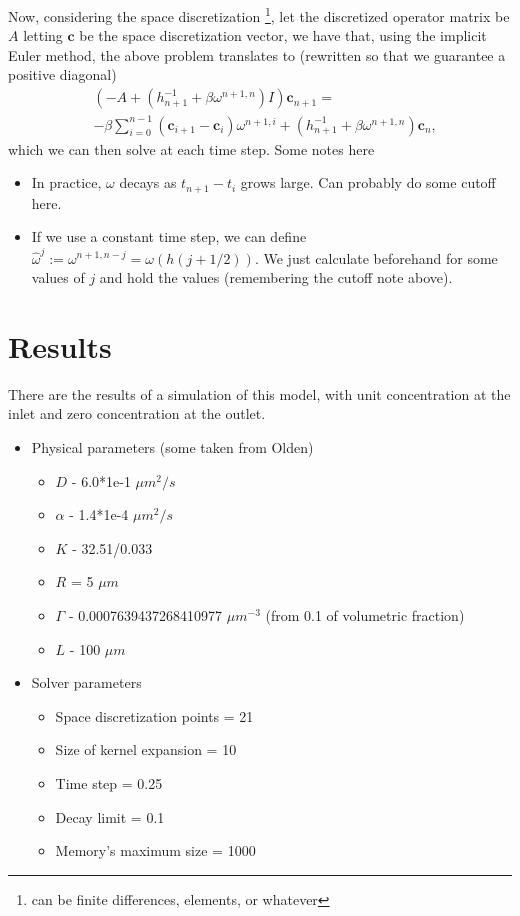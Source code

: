 \documentclass[]{article}
\begin{document}
Now, considering the space discretization \footnote{can be finite differences, elements, or whatever}, let the discretized operator matrix be $A$ letting $\mathbf{c}$ be the space discretization vector, we have that, using the implicit Euler method, the above problem translates to (rewritten so that we guarantee a positive diagonal)
\begin{equation}
 \begin{split}
 & \left(-A + (h_{n+1}^{-1} + \beta \omega^{n+1, n}) I \right)\mathbf{c}_{n+1} = \\
 & -\beta \sum_{i=0}^{n-1} (\mathbf{c}_{i+1} - \mathbf{c}_i) \omega^{n+1, i} + \left(h_{n+1}^{-1} + \beta \omega^{n+1, n} \right) \mathbf{c}_{n},
 \end{split}
\end{equation}
which we can then solve at each time step. Some notes here
\begin{itemize}
	\item In practice, $\omega$ decays as $t_{n+1} - t_i$ grows large. Can probably do some cutoff here.
	\item If we use a constant time step, we can define $\hat{\omega}^j := \omega^{n+1, n-j} = \omega(h(j + 1/2))$. We just calculate beforehand for some values of $j$ and hold the values (remembering the cutoff note above).
\end{itemize}

\section{Results}
There are the results of a simulation of this model, with unit concentration at the inlet and zero concentration at the outlet.
\begin{itemize}
	\item Physical parameters (some taken from Olden)
	\begin{itemize}
		\item $D$ - 6.0*1e-1 $\mu m^2/s$
		\item $\alpha$ - 1.4*1e-4 $\mu m^2/s$
		\item $K$ - 32.51/0.033
		\item $R$ = 5 $\mu m$
		\item $\Gamma$ - 0.0007639437268410977 $\mu m^{-3}$ (from 0.1 of volumetric fraction)
		\item $L$ - 100 $\mu m$
	\end{itemize}
	\item Solver parameters
	\begin{itemize}
		\item Space discretization points = 21
		\item Size of kernel expansion = 10
		\item Time step = 0.25
		\item Decay limit = 0.1
		\item Memory's maximum size = 1000
	\end{itemize}
\end{itemize}
\end{document}
